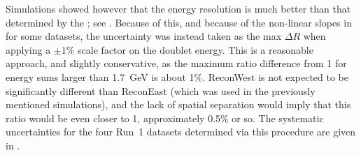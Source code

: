 Simulations showed however that the energy resolution is much better than that determined by the \chisq; see . Because of this, and because of the non-linear slopes in \R for some datasets, the uncertainty was instead taken as the max $\Delta R$ when applying a $\pm1\%$ scale factor on the doublet energy. This is a reasonable approach, and slightly conservative, as the maximum ratio difference from 1 for energy sums larger than \SI{1.7}{\GeV} is about 1\%. ReconWest is not expected to be significantly different than ReconEast (which was used in the previously mentioned simulations), and the lack of spatial separation would imply that this ratio would be even closer to 1, approximately 0.5\% or so. The systematic uncertainties for the four Run~1 datasets determined via this procedure are given in .


